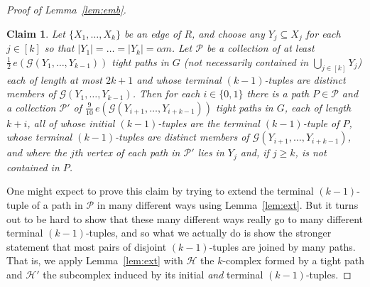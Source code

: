 \documentclass[12pt,a4paper]{amsart}
\newtheorem{claim}[theorem] {Claim}
\newcommand{\cG}{\mathcal{G}}
\newcommand{\paths}{\mathscr{P}}
\begin{document}
\begin{proof}[Proof of Lemma~\ref{lem:emb}]
 \begin{claim}\label{clm:emb} Let $\{X_1, \dots, X_k\}$ be an edge of $R$, and
 choose any $Y_j \subseteq X_j$ for each $j \in [k]$ so that $|Y_1| = \dots =
 |Y_k| = \alpha m$. Let $\paths$ be a collection of at least $\tfrac12\,e(\cG(Y_1,
 \dots, Y_{k-1}))$ tight paths in $G$ (not necessarily contained in $\bigcup_{j
 \in [k]} Y_j$) each of length at most $2k+1$ and whose terminal $(k-1)$-tuples
 are distinct members of $\cG(Y_1,\ldots,Y_{k-1})$. Then for each $i \in \{0,
 1\}$ there is a path $P\in\paths$ and a collection $\paths'$ of
 $\tfrac{9}{10}\,e(\cG(Y_{i+1},\ldots,Y_{i + k-1}))$ tight paths in $G$, each of length
 $k+i$, all of whose initial $(k-1)$-tuples are the terminal $(k-1)$-tuple of
 $P$, whose terminal $(k-1)$-tuples are distinct members of
 $\cG(Y_{i+1},\ldots,Y_{i+k-1})$, and where the $j$th vertex of each path in
 $\paths'$ lies in $Y_j$ and, if $j\ge k$, is not contained in $P$.
 \end{claim}
 
 One might expect to prove this claim by trying to extend the terminal $(k-1)$-tuple of a path in $\paths$ in many different ways using Lemma~\ref{lem:ext}. But it turns out to be hard to show that these many different ways really go to many different terminal $(k-1)$-tuples, and so what we actually do is show the stronger statement that most pairs of disjoint $(k-1)$-tuples are joined by many paths. That is, we apply Lemma~\ref{lem:ext} with $\mathcal{H}$ the $k$-complex formed by a tight path and $\mathcal{H}'$ the subcomplex induced by its initial \emph{and} terminal $(k-1)$-tuples.
 

\end{proof}
\end{document}
